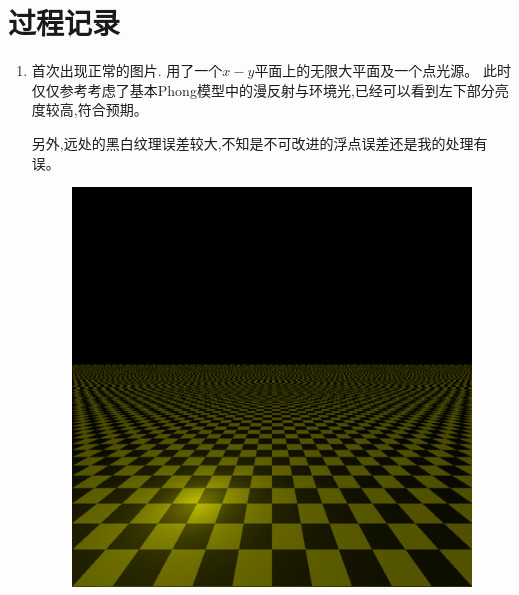 \section{过程记录}
\begin{enumerate}
    \item
首次出现正常的图片. 用了一个$ x-y$平面上的无限大平面及一个点光源。
此时仅仅参考\cite{phong}考虑了基本Phong模型中的漫反射与环境光,已经可以看到左下部分亮度较高,符合预期。

另外,远处的黑白纹理误差较大,不知是不可改进的浮点误差还是我的处理有误。
\begin{figure}[H]
  \centering
  \includegraphics[scale=0.4]{img/first_pic.png}
  \caption*{\label{fig:first}}
\end{figure}


\end{enumerate}
